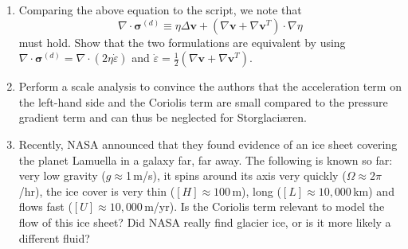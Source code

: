 \documentclass[parskip=half]{scrartcl}
\newcommand{\epsdot}{\dot{\varepsilon}}
\begin{document}
\begin{enumerate}
\item Comparing the above equation to the script, we note that $$\nabla \cdot \bm{\sigma}^{(d)} \equiv  \eta \Delta \bm{v} + \left( \nabla \bm{v} + \nabla \bm{v}^T\right) \cdot \nabla \eta $$ must hold. Show that the two formulations are equivalent by using $\nabla \cdot \bm{\sigma}^{(d)} = \nabla \cdot \left(2\eta \epsdot\right)$ and $\epsdot = \frac{1}{2}\left(\nabla \bm{v} + \nabla \bm{v}^{T}\right)$.
  
\item Perform a scale analysis to convince the authors that the acceleration term on the left-hand side and the Coriolis term are small compared to the pressure gradient term and can thus be neglected for Storglaci{\ae}ren. 

\item Recently, NASA announced that they found evidence of an ice sheet covering the planet Lamuella in a galaxy far, far away. The following is known so far: very low gravity ($g\approx$1\,m/s), it spins around its axis very quickly ($\Omega\approx 2\pi$/hr), the ice cover is very thin ($[H]\approx 100$\,m), long ($[L]\approx 10,000$\,km) and flows fast ($[U]\approx 10,000$\,m/yr). Is the Coriolis term relevant to model the flow of this ice sheet? Did NASA really find glacier ice, or is it more likely a different fluid?
\end{enumerate}




\end{document}
